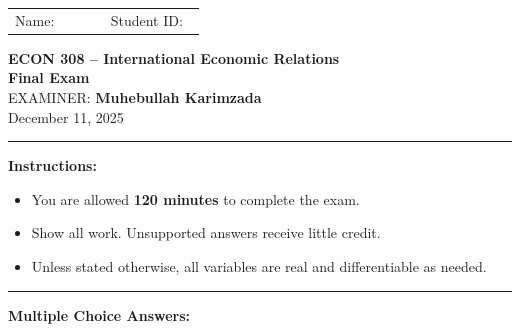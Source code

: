 \documentclass[12pt]{article}
\begin{document}

\begin{center}
\begin{tabular}{p{0.45\linewidth}p{0.45\linewidth}}
Name:\hrulefill & Student ID:\hrulefill \\
\end{tabular}

\vspace{2em}

\Large \textbf{ECON 308 -- International Economic Relations} \\[0.5em]
\large \textbf{Final Exam} \\[1em]

\normalsize EXAMINER: \textbf{Muhebullah Karimzada} \\[0.5em]
December 11, 2025
\end{center}



\hrule
\vspace{2em}
\textbf{Instructions:}
\begin{itemize}
\item You are allowed \textbf{120 minutes} to complete the exam.
    \item Show all work. Unsupported answers receive little credit.

    \item Unless stated otherwise, all variables are real and differentiable as needed.
\end{itemize}

\hrule

\vspace{1em}



\vspace{2em}

\textbf{Multiple Choice Answers:}

\vspace{0.8em}


\setlength{\tabcolsep}{18pt}
\end{document}
